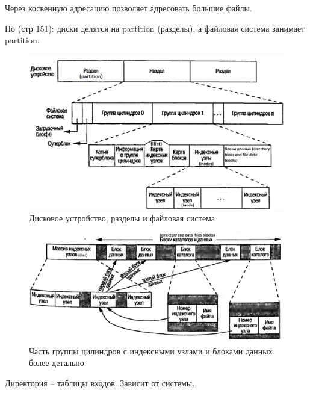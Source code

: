 Через косвенную адресацию позволяет адресовать большие файлы.

По \cite{UNIX_Prof_prog} (стр 151): диски делятся на partition (разделы), а файловая система занимает partition.

\begin{figure}[H]
  \centering
  \includegraphics[width=\textwidth]{pic/8.png}
  \caption{Дисковое устройство, разделы и файловая система}
\end{figure}

\begin{figure}[H]
  \centering
  \includegraphics[width=\textwidth]{pic/6.png}
  \caption{Часть группы цилиндров с индексными узлами и блоками данных более детально}
\end{figure}

Директория – таблицы входов.
Зависит от системы.

